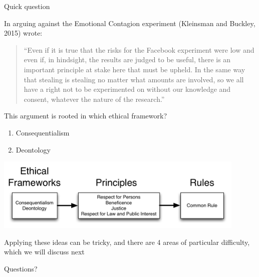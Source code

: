 \documentclass{beamer}
\begin{document}
\begin{frame} {Quick question}

In arguing against the Emotional Contagion experiment (Kleinsman and Buckley, 2015) wrote:
\begin{quote}
``Even if it is true that the risks for the Facebook experiment were low and even if, in hindsight, the results are judged to be useful, there is an important principle at stake here that must be upheld.  In the same way that stealing is stealing no matter what amounts are involved, so we all have a right not to be experimented on without our knowledge and consent, whatever the nature of the research.'' 
\end{quote}
This argument is rooted in which ethical framework?
\begin{enumerate}
\item Consequentialism
\item Deontology
\end{enumerate}

\end{frame}
\begin{frame}

\begin{center}
\includegraphics[width=0.9\textwidth]{figures/ethics_schematic_simple.png}
\end{center}

Applying these ideas can be tricky, and there are 4 areas of particular difficulty, which we will discuss next

\end{frame}

\begin{frame}[standout]

\begin{center}
\LARGE
Questions?
\end{center}

\end{frame}
\end{document}
